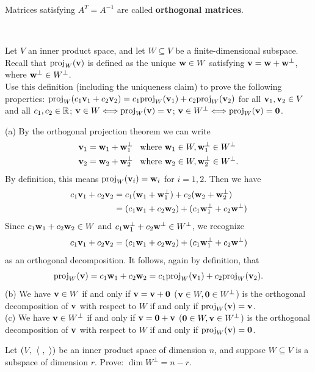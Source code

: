 Matrices satisfying $A^T=A^{-1}$ are called {\bf orthogonal matrices}. 
\\
\begin{solution}
\ 
\end{solution}
\ii\label{ex:orthproj} Let $V$ an inner product space, and let $W\subseteq V$ be a finite-dimensional subspace. 
\\
Recall that $\proj{\boldv}{W}$ is defined as the unique $\boldw\in W$ satisfying $\boldv=\boldw+\boldw^\perp$, where $\boldw^\perp\in W^\perp$. 
\\
Use this definition (including the uniqueness claim) to prove the following properties: 
\bb
\ii $\proj{c_1\boldv_1+c_2\boldv_2}{W}=c_1\proj{\boldv_1}{W}+c_2\proj{\boldv_2}{W}$ for all $\boldv_1,\boldv_2\in V$ and all $c_1,c_2\in \R$; 
\ii $\boldv\in W\Longleftrightarrow \proj{\boldv}{W}=\boldv$;
\ii $\boldv\in W^\perp\Longleftrightarrow \proj{\boldv}{W}=\boldzero$.

\ee
\begin{solution}
\noindent
(a) By the orthogonal projection theorem we can write 
\begin{align*}
\boldv_1&=\boldw_1+\boldw_1^\perp \hspace{5pt} \text{ where } \boldw_1\in W, \boldw_1^\perp\in W^\perp\\
\boldv_2&=\boldw_2+\boldw_2^\perp \hspace{5pt} \text{ where } \boldw_2\in W, \boldw_2^\perp\in W^\perp.
\end{align*}
By definition, this means $\proj{\boldv_i}{W}=\boldw_i$ for $i=1,2$. Then we have 
\begin{align*}
c_1\boldv_1+c_2\boldv_2&=c_1(\boldw_1+\boldw_1^\perp)+ c_2(\boldw_2+\boldw_2^\perp) \\
&=(c_1\boldw_1+c_2\boldw_2)+(c_1\boldw_1^\perp+c_2\boldw^\perp)
\end{align*}
Since $c_1\boldw_1+c_2\boldw_2\in W$ and $c_1\boldw_1^\perp+c_2\boldw^\perp\in W^\perp$, we recognize 
\[
c_1\boldv_1+c_2\boldv_2=(c_1\boldw_1+c_2\boldw_2)+(c_1\boldw_1^\perp+c_2\boldw^\perp)
\]
as an orthogonal decomposition. It follows, again by definition, that 
\[
\proj{\boldv}{W}=c_1\boldw_1+c_2\boldw_2=c_1\proj{\boldv_1}{W}+c_2\proj{\boldv_2}{W}.
\]
\noindent 
(b) We have 
$\boldv\in W$ if and only if  $\boldv=\boldv+\boldzero$ ($\boldv\in W, \boldzero\in W^\perp$) is the orthogonal decomposition of $\boldv$ with respect to $W$ if and only if $\proj{\boldv}{W}=\boldv$. 
\\
(c) We have 
$\boldv\in W^\perp$ if and only if  $\boldv=\boldzero+\boldv$ ($\boldzero\in W, \boldv\in W^\perp$) is the orthogonal decomposition of $\boldv$ with respect to $W$ if and only if $\proj{\boldv}{W}=\boldzero$. 
\end{solution}
\ii \label{ex:orthcomp}  Let $(V, \ \angvec{\ , \ })$ be an inner product space of dimension $n$, and suppose  $W\subseteq V$ is a subspace of dimension $r$. Prove: $\dim W^\perp=n-r$. 

